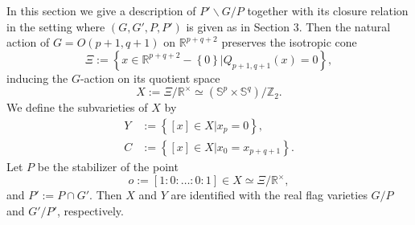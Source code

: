 \documentclass[reqno,12pt]{pja00} %
\newcommand{\mysetn}[2]{\left\{#1\big| #2\right\}}
\newcommand{\Z}{\mathbb{Z}}
\newcommand{\R}{\mathbb{R}}
\newcommand{\Sp}{\mathbb{S}}
\theoremstyle{plain}
\newcommand{\assign}{:=}
\theoremstyle{definition}
\theoremstyle{exampstyle} \newtheorem{examp}[theorem]{Theorem}
\let\setminus-
\begin{document}
In this section we give a description
of $P'\backslash G/P$ together with its closure relation in the setting where $(G,G',P,P')$ is given {as} in Section 3.
Then the natural action of $G=O(p+1,q+1)$ on $\R^{p+q+2}$ preserves the isotropic cone
\begin{equation*}
	\Xi:=\mysetn{x\in\R^{p+q+2}\setminus\left\{ 0 \right\}}{Q_{p+1,q+1}(x)=0},
\end{equation*}
inducing the $G$-action on its quotient space
\begin{equation*}
	X:=\Xi/\R^{\times}\simeq \left( \Sp^p\times\Sp^q \right)/\Z_2.
\end{equation*}
We define the subvarieties of $X$ by　
\begin{align*}
	Y&\assign\mysetn{[x]\in X}{x_p=0},\\
	C&\assign\mysetn{[x]\in X}{x_0=x_{p+q+1}}.
\end{align*}
Let $P$ be the stabilizer of the point \begin{equation*}
	o:=\left[ 1:0:\dots:0:1 \right]\in X \simeq \Xi/\R^{\times},
\end{equation*}and $P':=P\cap G'$. Then $X$ and $Y$ are identified with the real flag varieties $G/P$ and $G'/P'$, respectively.
\end{document}
